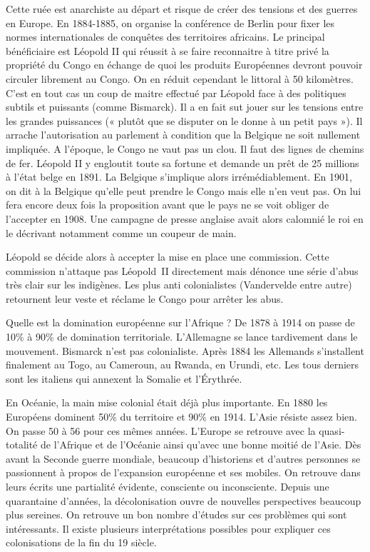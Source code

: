 \documentclass[12pt]{report}
\begin{document}
Cette ruée est anarchiste au départ et risque de créer des tensions et des guerres en Europe. En
1884-1885, on organise la conférence de Berlin pour fixer les normes internationales de
conquêtes des territoires africains. Le principal bénéficiaire est Léopold II qui réussit à se
faire reconnaitre à titre privé la propriété du Congo en échange de quoi les produits
Européennes devront pouvoir circuler librement au Congo. On en réduit cependant le littoral à
50 kilomètres. C’est en tout cas un coup de maitre effectué par Léopold face à des politiques
subtils et puissants (comme Bismarck). Il a en fait sut jouer sur les tensions entre les grandes
puissances (« plutôt que se disputer on le donne à un petit pays »). Il arrache l’autorisation au
parlement à condition que la Belgique ne soit nullement impliquée. A l’époque, le Congo ne
vaut pas un clou. Il faut des lignes de chemins de fer. Léopold II y engloutit toute sa fortune et
demande un prêt de 25 millions à l’état belge en 1891. La Belgique s’implique alors
irrémédiablement. En 1901, on dit à la Belgique qu’elle peut prendre le Congo mais elle n’en
veut pas. On lui fera encore deux fois la proposition avant que le pays ne se voit obliger de
l’accepter en 1908. Une campagne de presse anglaise avait alors calomnié le roi en le
décrivant notamment comme un coupeur de main.

Léopold se décide alors à accepter la mise en place une commission. Cette commission
n’attaque pas Léopold~II directement mais dénonce une série d’abus très clair sur les
indigènes. Les plus anti colonialistes (Vandervelde entre autre) retournent leur veste et
réclame le Congo pour arrêter les abus.

Quelle est la domination européenne sur l’Afrique ? De 1878 à 1914 on passe de 10\% à 90\%
de domination territoriale. L’Allemagne se lance tardivement dans le mouvement. Bismarck
n’est pas colonialiste. Après 1884 les Allemands s’installent finalement au Togo, au
Cameroun, au Rwanda, en Urundi, etc. Les tous derniers sont les italiens qui annexent la
Somalie et l’Érythrée.

En Océanie, la main mise colonial était déjà plus importante. En 1880 les Européens
dominent 50\% du territoire et 90\% en 1914. L’Asie résiste assez bien. On passe 50 à 56%
pour ces mêmes années. L’Europe se retrouve avec la quasi-totalité de l’Afrique et de
l’Océanie ainsi qu’avec une bonne moitié de l’Asie. Dès avant la Seconde guerre mondiale,
beaucoup d’historiens et d’autres personnes se passionnent à propos de l’expansion
européenne et ses mobiles. On retrouve dans leurs écrits une partialité évidente, consciente ou
inconsciente. Depuis une quarantaine d’années, la décolonisation ouvre de nouvelles
perspectives beaucoup plus sereines. On retrouve un bon nombre d’études sur ces problèmes
qui sont intéressants. Il existe plusieurs interprétations possibles pour expliquer ces
colonisations de la fin du 19 siècle.
\end{document}
